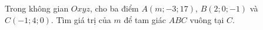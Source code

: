 \begin{ex}
Trong không gian $Oxyz$, cho ba điểm $A(m;-3;17)$, $B(2;0;-1)$ và $C(-1;4;0)$. Tìm giá trị của $m$ để tam giác $ABC$ vuông tại $C$.
\end{ex}
